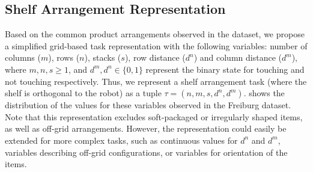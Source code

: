 



\subsection{Shelf Arrangement Representation}
\label{sec:irosrepresentation}

Based on the common product arrangements observed in the dataset, we propose a simplified grid-based task representation with the following variables: number of columns ($m$), rows ($n$), stacks ($s$), row distance ($d^n$) and column distance ($d^m$), where $m, n, s \geq 1$, and $d^m, d^n \in \{0,1\}$ represent the binary state for touching and not touching respectively.
Thus, we represent a shelf arrangement task (where the shelf is orthogonal to the robot) as a tuple $\tau = (n, m, s,d^n,d^m)$. 
 shows the distribution of the values for these variables observed in the Freiburg dataset.
Note that this representation excludes soft-packaged or irregularly shaped items, as well as off-grid arrangements.
However, the representation could easily be extended for more complex tasks, such as continuous values for $d^n$ and $d^m$, variables describing off-grid configurations, or variables for orientation of the items.

